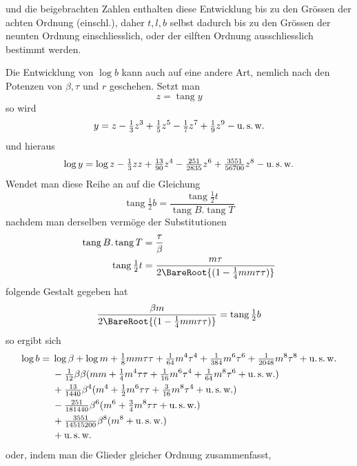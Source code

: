 %
und die beigebrachten Zahlen enthalten diese Entwicklung bis zu den Grössen der achten Ordnung (einschl.), daher \(t,l,b\) selbst dadurch bis zu den Grössen der neunten Ordnung einschliesslich, oder der eilften Ordnung ausschliesslich bestimmt werden.

Die Entwicklung von \(\log b\) kann auch auf eine andere Art, nemlich nach den Potenzen von \(\beta,\tau\) und \(r\) geschehen. Setzt man
\[
z=\operatorname{tang}y
\]
so wird
\[
y=z-\tfrac13z^3+\tfrac15z^5-\tfrac17z^7+\tfrac19z^9-\text{u.\,s.\,w.}
\]
und hieraus
\[
\log y=\log z-\tfrac13zz+\tfrac{13}{90}z^4-\tfrac{251}{2835}z^6+\tfrac{3551}{56700}z^8-\text{u.\,s.\,w.}
\]
Wendet man diese Reihe an auf die Gleichung
\[
\operatorname{tang}\tfrac12b=\frac{\operatorname{tang}\frac12t}{\operatorname{tang}B\mathord{.}\operatorname{tang}T}
\]
nachdem man derselben vermöge der Substitutionen
\[
\begin{aligned}
\operatorname{tang}B\mathord{.}\operatorname{tang}T&=\frac\tau\beta\\
\operatorname{tang}\tfrac12t&=\frac{m\tau}{2\BareRoot{(1-\frac14mm\tau\tau)}}
\end{aligned}
\]
folgende Gestalt gegeben hat
\[
\frac{\beta m}{2\BareRoot{(1-\frac14mm\tau\tau)}}=\operatorname{tang}\tfrac12b
\]
so ergibt sich
\[
\begin{aligned}
\log b={}&\log\beta+\log m+\tfrac18mm\tau\tau+\tfrac1{64}m^4\tau^4+\tfrac1{384}m^6\tau^6+\tfrac1{2048}m^8\tau^8+\text{u.\,s.\,w.}\\
&-\tfrac1{12}\beta\beta(mm+\tfrac14m^4\tau\tau+\tfrac1{16}m^6\tau^4+\tfrac1{64}m^8\tau^6+\text{u.\,s.\,w.})\\
&+\tfrac{13}{1440}\beta^4(m^4+\tfrac12m^6\tau\tau+\tfrac3{16}m^8\tau^4+\text{u.\,s.\,w.})\\
&-\tfrac{251}{181440}\beta^6(m^6+\tfrac34m^8\tau\tau+\text{u.\,s.\,w.})\\
&+\tfrac{3551}{14515200}\beta^8(m^8+\text{u.\,s.\,w.})\\
&+\text{u.\,s.\,w.}
\end{aligned}
\]
oder, indem man die Glieder gleicher Ordnung zusammenfasst,
